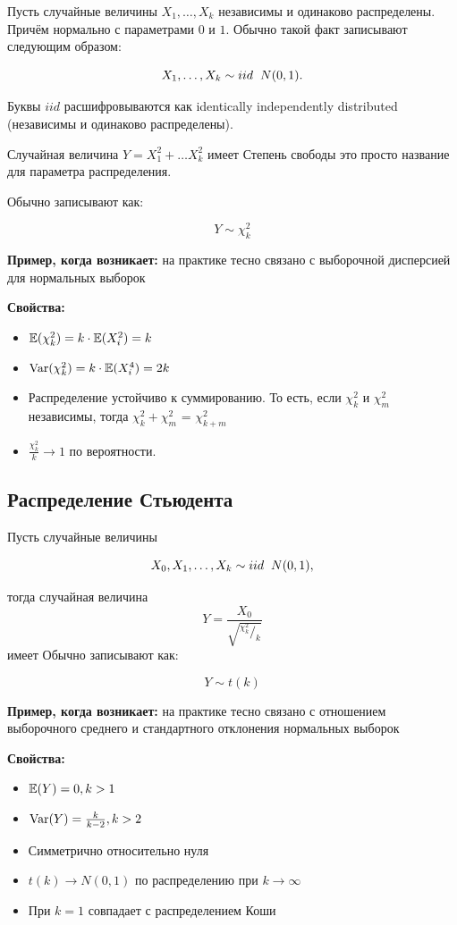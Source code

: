 \documentclass[12pt, a4paper, oneside]{article}
\begin{document}
Пусть случайные величины $X_1, \ldots, X_k$ независимы и одинаково распределены. Причём нормально с параметрами $0$ и $1$. Обычно такой факт записывают следующим образом: 

$$
X_1, \ldots, X_k \sim iid \hspace{2mm} N(0,1).
$$ 

Буквы $iid$ расшифровываются как identically independently distributed (независимы и одинаково распределены).

Случайная величина $Y = X_1^2 + \ldots X_k^2$ имеет   Степень свободы это просто название для параметра распределения.

Обычно записывают как:

$$
Y \sim \chi^2_k
$$   

\textbf{Пример, когда возникает:} на практике тесно связано с выборочной дисперсией для нормальных выборок

\textbf{Свойства:}

\begin{itemize} 
\item $\mathbb{E}(\chi^2_k) = k \cdot \mathbb{E}(X_i^2) = k$
\item $\operatorname{Var}(\chi^2_k) = k \cdot \mathbb{E}(X_i^4) = 2k$
\item Распределение устойчиво к суммированию. То есть, если $\chi^2_k$ и $\chi^2_m$ независимы, тогда $\chi^2_k + \chi^2_m$ = $\chi^2_{k+m}$
\item $\frac{\chi^2_k}{k} \to 1$ по вероятности. 
\end{itemize} 


\subsection*{Распределение Стьюдента}

Пусть случайные величины

$$
X_0, X_1, \ldots, X_k \sim iid \hspace{2mm} N(0,1),
$$ 

тогда случайная величина $$ Y = \frac{X_0}{\sqrt{^{\chi^2_k}/_k}} $$ имеет   
Обычно записывают как:

$$
Y \sim t(k)
$$   

\textbf{Пример, когда возникает:} на практике тесно связано с отношением выборочного среднего и стандартного отклонения нормальных выборок

\textbf{Свойства:}

\begin{itemize} 
\item $\mathbb{E}(Y) = 0, k > 1$
\item $\operatorname{Var}(Y) = \frac{k}{k-2}, k > 2$
\item Симметрично относительно нуля
\item $t(k) \to N(0,1)$ по распределению при $k \to \infty$
\item При $k=1$ совпадает с распределением Коши
\end{itemize} 
\end{document}
